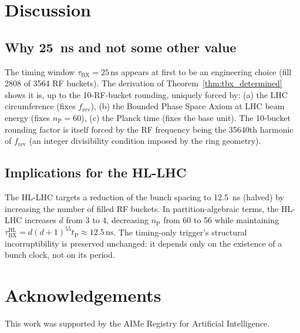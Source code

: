 \documentclass[twocolumn,10pt,a4paper]{article}
\theoremstyle{thmstyle}
\theoremstyle{definition}
\theoremstyle{remark}
\newcommand{\nP}{n_{\mathrm{P}}}
\newcommand{\tP}{t_{\mathrm{P}}}
\newcommand{\tBX}{\tau_{\mathrm{BX}}}
\begin{document}
\section{Discussion}
\label{sec:disc}

\subsection{Why 25~ns and not some other value}

The timing window $\tBX = 25\,\mathrm{ns}$ appears at first to be
an engineering choice (fill 2808 of 3564 RF buckets). The derivation
of Theorem~\ref{thm:tbx_determined} shows it is, up to the 10-RF-bucket
rounding, uniquely forced by:
(a) the LHC circumference (fixes $f_{\mathrm{rev}}$),
(b) the Bounded Phase Space Axiom at LHC beam energy (fixes $\nP = 60$),
(c) the Planck time (fixes the base unit).
The 10-bucket rounding factor is itself forced by the RF frequency being
the 35640th harmonic of $f_{\mathrm{rev}}$ (an integer divisibility condition
imposed by the ring geometry).

\subsection{Implications for the HL-LHC}

The HL-LHC targets a reduction of the bunch spacing to 12.5~ns (halved)
by increasing the number of filled RF buckets. In partition-algebraic
terms, the HL-LHC increases $d$ from 3 to 4, decreasing $\nP$ from 60 to 56
while maintaining $\tBX^{\mathrm{HL}} = d(d+1)^{55}\tP \approx 12.5\,\mathrm{ns}$.
The timing-only trigger's structural incorruptibility is preserved unchanged:
it depends only on the existence of a bunch clock, not on its period.

\section*{Acknowledgements}
This work was supported by the AIMe Registry for Artificial Intelligence.



\end{document}

